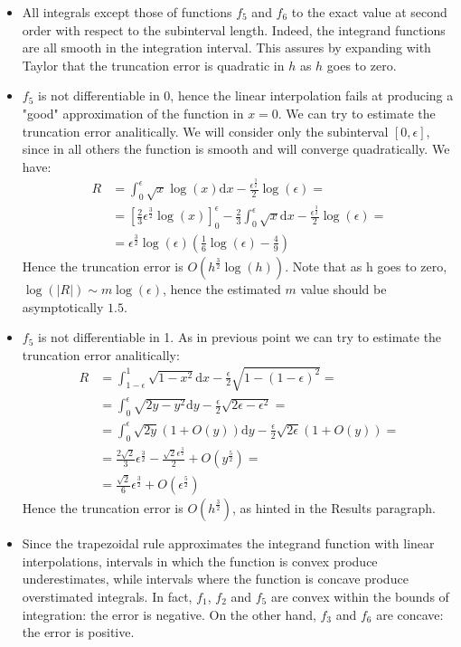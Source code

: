 \documentclass[a4paper,11]{article}
\begin{document}
\begin{itemize}
	\item{
		All integrals except those of functions $f_{5}$ and $f_{6}$ to the
		exact value at second order with respect to the subinterval length.
		Indeed, the integrand functions are all smooth in the integration
		interval. This assures by expanding with Taylor that the truncation 
		error is quadratic in $h$ as $h$ goes to zero.
	}
	\item{
		$f_{5}$ is not differentiable in 0, hence the linear interpolation 
		fails at producing a "good" approximation of the function in 
		$x=0$. We can try to estimate the truncation error analitically. We will
		consider only the subinterval $[0,\epsilon]$, since in all others
		the function is smooth and will converge quadratically. We have:
		\[
		\begin{aligned}
			R &= \int^{\epsilon}_{0}\sqrt{x}\log(x)\mathrm{d}x - 
				\frac{\epsilon^{\frac{3}{2}}}{2}\log(\epsilon) = \\
			&= \left[\frac{2}{3}\epsilon^{\frac{3}{2}}\log(x)\right]^{\epsilon}_{0} 
			- \frac{2}{3}\int^{\epsilon}_{0}\sqrt{x}\mathrm{d}x 
				- \frac{\epsilon^{\frac{3}{2}}}{2}\log(\epsilon) = \\
			&= \epsilon^{\frac{3}{2}}\log(\epsilon)\left( \frac{1}{6}
			\log(\epsilon) - \frac{4}{9} \right){}
			\end{aligned}
		\]
		Hence the truncation error is $O(h^{\frac{3}{2}}\log(h))$. Note that
		as h goes to zero, $\log(|R|) \sim m \log(\epsilon)$, hence the estimated
		$m$ value should be asymptotically $1.5$.
	}
	\item{
		$f_{5}$ is not differentiable in 1. As in previous point we can try
		to estimate the truncation error analitically:
		\[
			\begin{aligned}
				R &= \int^{1}_{1-\epsilon} \sqrt{1-x^{2}}\mathrm{d}x - 
				\frac{\epsilon}{2}\sqrt{1-(1-\epsilon)^{2}} = \\
				&= \int^{\epsilon}_{0} \sqrt{2y - y^{2}} \mathrm{d}y -
				\frac{\epsilon}{2}\sqrt{2\epsilon-\epsilon^{2}} = \\
				&= \int^{\epsilon}_{0} \sqrt{2y}(1 + O(y)) \mathrm{d}y -
					\frac{\epsilon}{2}\sqrt{2\epsilon}(1 + O(y)) = \\
				&= \frac{2\sqrt{2}}{3}\epsilon^{\frac{3}{2}} -
				\frac{\sqrt{2}\epsilon^{\frac{3}{2}}}{2} + O(y^{\frac{5}{2}})= \\
				&= \frac{\sqrt{2}}{6}\epsilon^{\frac{3}{2}} + 
				O(\epsilon^{\frac{5}{2}})
			\end{aligned}
		\]
		Hence the truncation error is $O(h^{\frac{3}{2}})$, as hinted in the
		Results paragraph.
	}
	\item{
		Since the trapezoidal rule approximates the integrand function with
		linear interpolations, intervals in which the function is convex 
		produce underestimates, while intervals where the function is concave
		produce overstimated integrals. 
		In fact, $f_{1}$, $f_{2}$ and $f_{5}$ are convex within the bounds 
		of integration: the error is negative.
		On the other hand, $f_{3}$ and $f_{6}$ are concave: the error is 
		positive.
	}
\end{itemize}
\end{document}
